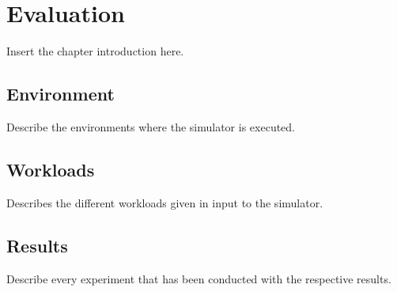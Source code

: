 \chapter{Evaluation}
\label{chp:evaluation}


Insert the chapter introduction here.


\section{Environment}
\label{sec:evaluation-environment}
Describe the environments where the simulator is executed.


\section{Workloads}
\label{sec:evaluation-workloads}
Describes the different workloads given in input to the simulator.

\section{Results}
\label{sec:evaluation-results}
Describe every experiment that has been conducted with the respective results.